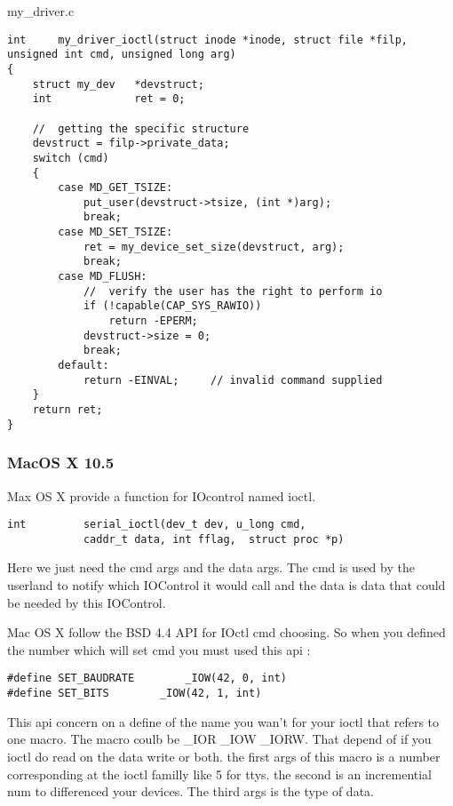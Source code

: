 \documentclass[11pt]{report}
\begin{document}
my\_driver.c
\begin{lstlisting}
int     my_driver_ioctl(struct inode *inode, struct file *filp, unsigned int cmd, unsigned long arg)
{
    struct my_dev   *devstruct;
    int             ret = 0;
    
    //  getting the specific structure
    devstruct = filp->private_data;
    switch (cmd)
    {
        case MD_GET_TSIZE:
            put_user(devstruct->tsize, (int *)arg);
            break;
        case MD_SET_TSIZE:
            ret = my_device_set_size(devstruct, arg);
            break;
        case MD_FLUSH:
            //  verify the user has the right to perform io
            if (!capable(CAP_SYS_RAWIO))
                return -EPERM;
            devstruct->size = 0;
            break;
        default:
            return -EINVAL;     // invalid command supplied
    }
    return ret;
}
\end{lstlisting}

\subsubsection{MacOS X 10.5}

Max OS X provide a function for IOcontrol named ioctl.
\begin{lstlisting}
int			serial_ioctl(dev_t dev, u_long cmd,
			caddr_t data, int fflag,  struct proc *p)
\end{lstlisting}
Here we just need the cmd args and the data args. The cmd is used by the userland to
notify which IOControl it would call and the data is data that could be needed by this 
IOControl.

Mac OS X follow the BSD 4.4 API for IOctl cmd choosing. So when you defined the number
which will set cmd you must used this api : 
\begin{lstlisting}
#define	SET_BAUDRATE		_IOW(42, 0, int)
#define	SET_BITS		_IOW(42, 1, int)
\end{lstlisting}
This api concern on a define of the name you wan't for your ioctl that refers to one macro.
The macro coulb be \_IOR \_IOW \_IORW. That depend of if you ioctl do read on the data write
or both. the first args of this macro is a number corresponding at the ioctl familly like 5 for
ttys. the second is an incremential num to differenced your devices. The third args is the type
of data.
\end{document}
